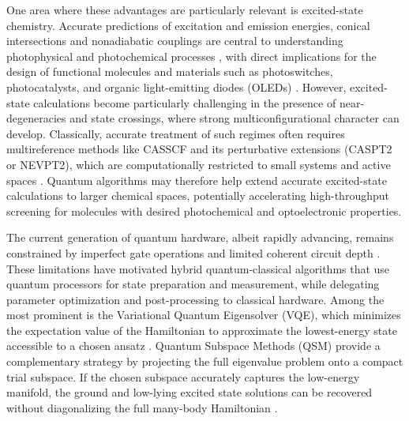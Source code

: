 One area where these advantages are particularly relevant is excited-state chemistry. 
Accurate predictions of excitation and emission energies, conical intersections and nonadiabatic couplings are central to understanding photophysical and photochemical processes \cite{Dreuw2026ExcitedStateReview, Matsika2021NACReview}, with direct implications for the design of functional molecules and materials such as photoswitches, photocatalysts, and organic light-emitting diodes (OLEDs) \cite{Hutcheson2021Photoswitches, Ong2024PhotocatalystApplication, Santos2024OledReview}. 
However, excited-state calculations become particularly challenging in the presence of near-degeneracies and state crossings, where strong multiconfigurational character can develop.
Classically, accurate treatment of such regimes often requires multireference methods like CASSCF and its perturbative extensions (CASPT2 or NEVPT2), which are computationally restricted to small systems and active spaces \cite{Mai2020PhotochemistryMiniReview}. 
Quantum algorithms may therefore help extend accurate excited-state calculations to larger chemical spaces, potentially accelerating high-throughput screening for molecules with desired photochemical and optoelectronic properties.

The current generation of quantum hardware, albeit rapidly advancing, remains constrained by imperfect gate operations and limited coherent circuit depth \cite{Fauseweh2024QuantumHardwareReview, Ransford2026QuantinuumHelios, Acharya2025GoogleWillow}.
These limitations have motivated hybrid quantum-classical algorithms that use quantum processors for state preparation and measurement, while delegating parameter optimization and post-processing to classical hardware. Among the most prominent is the Variational Quantum Eigensolver (VQE), which minimizes the expectation value of the Hamiltonian to approximate the lowest-energy state accessible to a chosen ansatz \cite{McArdle2020QuantumComputingChemistryReview, Cao2019QCforQCReview, Kumar2025VQEReview}.
Quantum Subspace Methods (QSM) provide a complementary strategy by projecting the full eigenvalue problem onto a compact trial subspace. 
If the chosen subspace accurately captures the low-energy manifold, the ground and low-lying excited state solutions can be recovered without diagonalizing the full many-body Hamiltonian \cite{Motta2024QSMReview}. 

